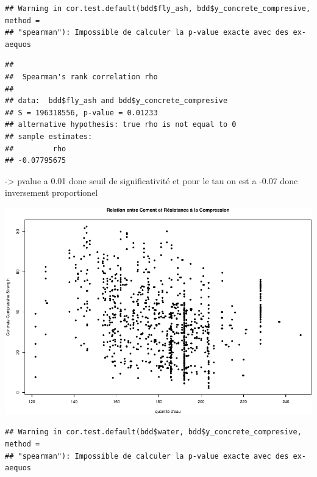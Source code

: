 \documentclass[
  12pt,
]{article}
\newenvironment{Shaded}{\begin{snugshade}}{\end{snugshade}}
\newcommand{\AttributeTok}[1]{\textcolor[rgb]{0.13,0.29,0.53}{#1}}
\newcommand{\FunctionTok}[1]{\textcolor[rgb]{0.13,0.29,0.53}{\textbf{#1}}}
\newcommand{\NormalTok}[1]{#1}
\newcommand{\SpecialCharTok}[1]{\textcolor[rgb]{0.81,0.36,0.00}{\textbf{#1}}}
\newcommand{\StringTok}[1]{\textcolor[rgb]{0.31,0.60,0.02}{#1}}
\begin{document}
\begin{verbatim}
## Warning in cor.test.default(bdd$fly_ash, bdd$y_concrete_compresive, method =
## "spearman"): Impossible de calculer la p-value exacte avec des ex-aequos
\end{verbatim}

\begin{verbatim}
## 
##  Spearman's rank correlation rho
## 
## data:  bdd$fly_ash and bdd$y_concrete_compresive
## S = 196318556, p-value = 0.01233
## alternative hypothesis: true rho is not equal to 0
## sample estimates:
##         rho 
## -0.07795675
\end{verbatim}

-\textgreater{} pvalue a 0.01 donc seuil de significativité et pour le
tau on est a -0.07 donc inversement proportionel

\begin{center}\includegraphics{rmd_final_files/figure-latex/unnamed-chunk-9-1} \end{center}

\begin{Shaded}
\end{Shaded}

\begin{verbatim}
## Warning in cor.test.default(bdd$water, bdd$y_concrete_compresive, method =
## "spearman"): Impossible de calculer la p-value exacte avec des ex-aequos
\end{verbatim}
\end{document}
